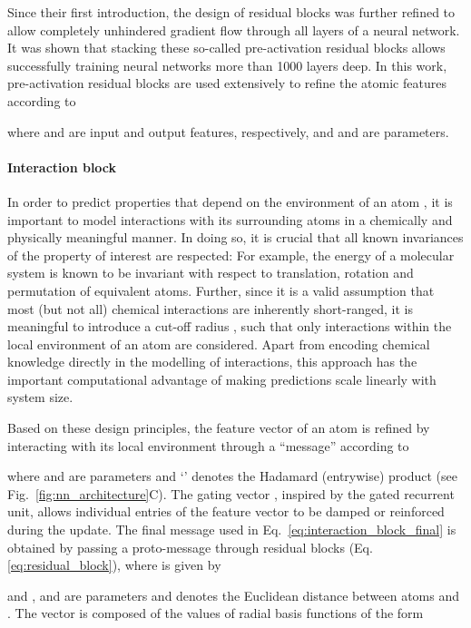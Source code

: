 \documentclass[12pt]{article}
\begin{document}
Since their first introduction, the design of residual blocks was
further refined to allow completely unhindered gradient flow through
all layers of a neural network.\cite{he2016identity} It was shown that
stacking these so-called pre-activation residual blocks allows
successfully training neural networks more than \num{1000} layers
deep.\cite{he2016identity} In this work, pre-activation residual
blocks are used extensively to refine the atomic features according to

where  and  are input and
output features, respectively, and  and  are parameters.

\paragraph{Interaction block}
In order to predict properties that depend on the environment of an
atom , it is important to model interactions with its surrounding
atoms  in a chemically and physically meaningful manner. In doing
so, it is crucial that all known invariances of the property of
interest are respected: For example, the energy of a molecular system
is known to be invariant with respect to translation, rotation and
permutation of equivalent atoms.\cite{behler2011atom} Further, since
it is a valid assumption that most (but not all) chemical interactions
are inherently short-ranged,\cite{unke2018reactive} it is meaningful
to introduce a cut-off radius , such that only interactions
within the local environment of an atom are considered. Apart from
encoding chemical knowledge directly in the modelling of interactions,
this approach has the important computational advantage of making
predictions scale linearly with system size.

Based on these design principles, the feature vector  of
an atom is refined by interacting with its local environment through a
``message''\cite{gilmer2017neural} 
according to

where  and
 are parameters and
`' denotes the Hadamard (entrywise) product (see
Fig.~\ref{fig:nn_architecture}C). The gating vector ,
inspired by the gated recurrent unit,\cite{cho2014learning} allows
individual entries of the feature vector to be damped or reinforced
during the update.  The final message  used in
Eq.~\ref{eq:interaction_block_final} is obtained by passing a
proto-message  through  residual blocks (Eq.~ \ref{eq:residual_block}), where
 is given by

and ,  and  are parameters and  denotes the Euclidean distance between atoms  and . The vector  is composed of the values of  radial basis functions of the form
\end{document}
